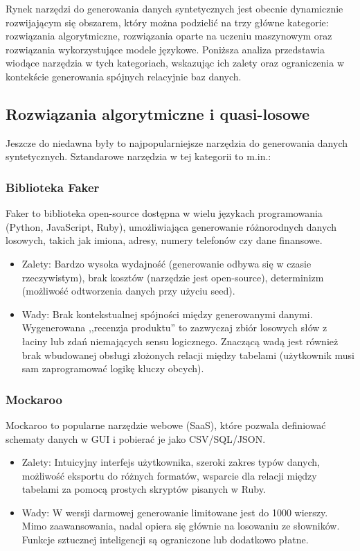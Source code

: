Rynek narzędzi do generowania danych syntetycznych jest obecnie dynamicznie rozwijającym się obszarem, który można podzielić na trzy główne kategorie: rozwiązania algorytmiczne, rozwiązania oparte na uczeniu maszynowym oraz rozwiązania wykorzystujące modele językowe. Poniższa analiza przedstawia wiodące narzędzia w tych kategoriach, wskazując ich zalety oraz ograniczenia w kontekście generowania spójnych relacyjnie baz danych.

\subsection*{Rozwiązania algorytmiczne i quasi-losowe}
Jeszcze do niedawna były to najpopularniejsze narzędzia do generowania danych syntetycznych. Sztandarowe narzędzia w tej kategorii to m.in.:

\subsubsection*{Biblioteka Faker}
Faker \cite{fakerjs} to biblioteka open-source dostępna w wielu językach programowania (Python, JavaScript, Ruby), umożliwiająca generowanie różnorodnych danych losowych, takich jak imiona, adresy, numery telefonów czy dane finansowe.
\begin{itemize}
    \item Zalety: Bardzo wysoka wydajność (generowanie odbywa się w czasie rzeczywistym), brak kosztów (narzędzie jest open-source), determinizm (możliwość odtworzenia danych przy użyciu seed).
    \item Wady: Brak kontekstualnej spójności między generowanymi danymi. Wygenerowana ,,recenzja produktu'' to zazwyczaj zbiór losowych słów z łaciny lub zdań niemających sensu logicznego. Znaczącą wadą jest również brak wbudowanej obsługi złożonych relacji między tabelami (użytkownik musi sam zaprogramować logikę kluczy obcych).
\end{itemize}

\subsubsection*{Mockaroo}
Mockaroo to popularne narzędzie webowe (\gls{SaaS}), które pozwala definiować schematy danych w GUI i pobierać je jako \gls{CSV}/\gls{SQL}/\gls{JSON}.
\begin{itemize}
    \item Zalety: Intuicyjny interfejs użytkownika, szeroki zakres typów danych, możliwość eksportu do różnych formatów, wsparcie dla relacji między tabelami za pomocą prostych skryptów pisanych w Ruby.
    \item Wady: W wersji darmowej generowanie limitowane jest do 1000 wierszy. Mimo zaawansowania, nadal opiera się głównie na losowaniu ze słowników. Funkcje sztucznej inteligencji są ograniczone lub dodatkowo płatne.
\end{itemize}

